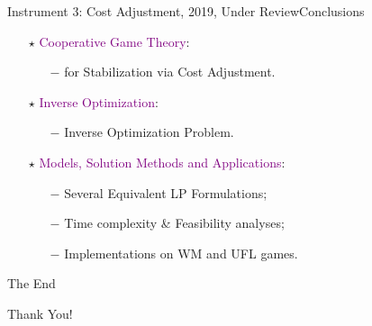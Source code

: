 \documentclass[14pt]{beamer}
\begin{document}
\begin{frame}{Instrument 3: Cost Adjustment, {\footnotesize 2019, Under Review}}{Conclusions}
\centering
\vspace{2mm}
\begin{itemize}
\normalsize
\justifying
\item[$\star$] \textcolor{purple}{Cooperative Game Theory}:
\begin{itemize}
\small
\vspace{2mm}
\item[$-$] {\color{blue}{New Instrument}} for Stabilization via Cost Adjustment.
\vspace{2mm}
\end{itemize}
\item[$\star$] \textcolor{purple}{Inverse Optimization}:
\begin{itemize}
\small
\vspace{2mm}
\item[$-$] {\color{blue}{Constrained}} Inverse Optimization Problem.
\vspace{2mm}
\end{itemize}
\item[$\star$] \textcolor{purple}{Models, Solution Methods and Applications}:
\begin{itemize}
\small
\vspace{2mm}
\item[$-$] Several Equivalent LP Formulations;
\vspace{2mm}
\item[$-$] Time complexity \& Feasibility analyses;
\vspace{2mm}
\item[$-$] Implementations on WM and UFL games.
\end{itemize}
\end{itemize}
\end{frame}

\begin{frame}{The End}
\huge
\begin{center}
	Thank You!
\end{center}
\end{frame}
\end{document}
